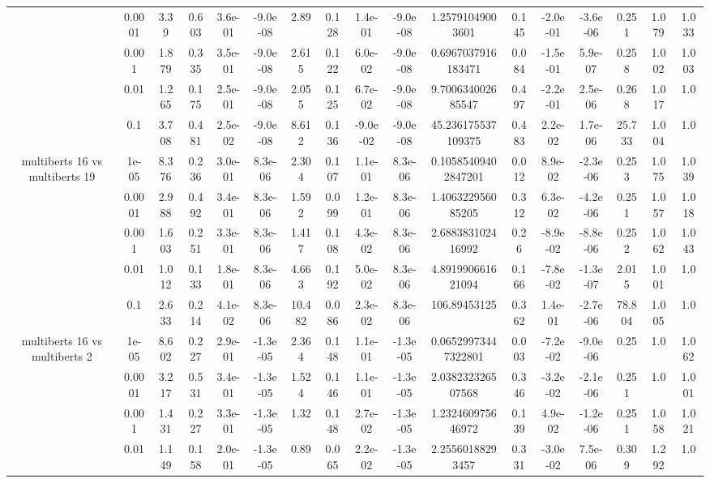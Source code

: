 \begin{tabular}{|c|c|c|c|c|c|c|c|c|c|c|c|c|c|c|c|c|}
 & 0.0001 & 3.39 & 0.603 & 3.6e-01 & -9.0e-08 & 2.89 & 0.128 & 1.4e-01 & -9.0e-08 & 1.25791049003601 & 0.145 & -2.0e-01 & -3.6e-06 & 0.251 & 1.079 & 1.033 \\
 & 0.001 & 1.879 & 0.335 & 3.5e-01 & -9.0e-08 & 2.615 & 0.122 & 6.0e-02 & -9.0e-08 & 0.6967037916183471 & 0.084 & -1.5e-01 & 5.9e-07 & 0.258 & 1.002 & 1.003 \\
 & 0.01 & 1.265 & 0.175 & 2.5e-01 & -9.0e-08 & 2.055 & 0.125 & 6.7e-02 & -9.0e-08 & 9.700634002685547 & 0.497 & -2.2e-01 & 2.5e-06 & 0.268 & 1.017 & 1.0 \\
 & 0.1 & 3.708 & 0.481 & 2.5e-02 & -9.0e-08 & 8.612 & 0.136 & -9.0e-02 & -9.0e-08 & 45.236175537109375 & 0.483 & 2.2e-02 & 1.7e-06 & 25.733 & 1.004 & 1.0 \\
\hline
\multirow{5}{*}{multiberts 16 vs multiberts 19} & 1e-05 & 8.376 & 0.236 & 3.0e-01 & 8.3e-06 & 2.304 & 0.107 & 1.1e-01 & 8.3e-06 & 0.10585409402847201 & 0.012 & 8.9e-02 & -2.3e-06 & 0.253 & 1.075 & 1.039 \\
 & 0.0001 & 2.988 & 0.492 & 3.4e-01 & 8.3e-06 & 1.592 & 0.099 & 1.2e-01 & 8.3e-06 & 1.406322956085205 & 0.312 & 6.3e-02 & -4.2e-06 & 0.251 & 1.057 & 1.018 \\
 & 0.001 & 1.603 & 0.251 & 3.3e-01 & 8.3e-06 & 1.417 & 0.108 & 4.3e-02 & 8.3e-06 & 2.688383102416992 & 0.26 & -8.9e-02 & -8.8e-06 & 0.252 & 1.062 & 1.043 \\
 & 0.01 & 1.012 & 0.133 & 1.8e-01 & 8.3e-06 & 4.663 & 0.192 & 5.0e-02 & 8.3e-06 & 4.891990661621094 & 0.166 & -7.8e-02 & -1.3e-07 & 2.015 & 1.001 & 1.0 \\
 & 0.1 & 2.633 & 0.214 & 4.1e-02 & 8.3e-06 & 10.482 & 0.086 & 2.3e-02 & 8.3e-06 & 106.89453125 & 0.362 & 1.4e-01 & -2.7e-06 & 78.804 & 1.005 & 1.0 \\
\hline
\multirow{5}{*}{multiberts 16 vs multiberts 2} & 1e-05 & 8.602 & 0.227 & 2.9e-01 & -1.3e-05 & 2.364 & 0.148 & 1.1e-01 & -1.3e-05 & 0.06529973447322801 & 0.003 & -7.2e-02 & -9.0e-06 & 0.25 & 1.0 & 1.062 \\
 & 0.0001 & 3.217 & 0.531 & 3.4e-01 & -1.3e-05 & 1.524 & 0.146 & 1.1e-01 & -1.3e-05 & 2.038232326507568 & 0.346 & -3.2e-02 & -2.1e-06 & 0.251 & 1.0 & 1.001 \\
 & 0.001 & 1.431 & 0.227 & 3.3e-01 & -1.3e-05 & 1.32 & 0.148 & 2.7e-02 & -1.3e-05 & 1.232460975646972 & 0.139 & 4.9e-02 & -1.2e-06 & 0.251 & 1.058 & 1.021 \\
 & 0.01 & 1.149 & 0.158 & 2.0e-01 & -1.3e-05 & 0.89 & 0.065 & 2.2e-02 & -1.3e-05 & 2.25560188293457 & 0.331 & -3.0e-02 & 7.5e-06 & 0.309 & 1.292 & 1.0 \\

\end{tabular}

